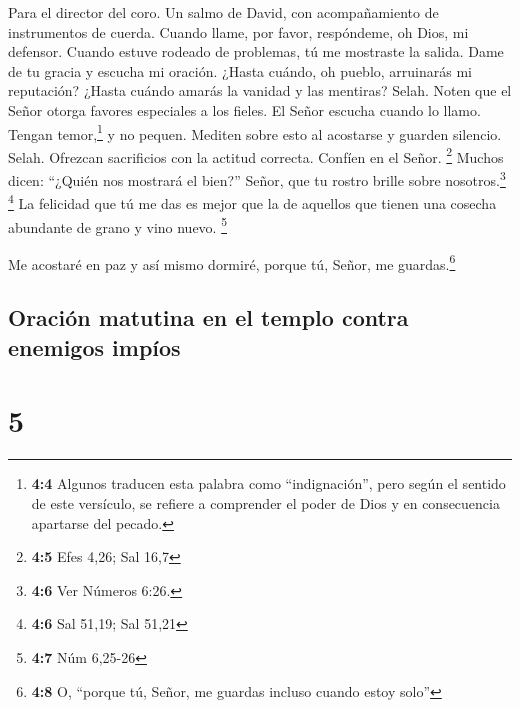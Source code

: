 Para el director del coro. Un salmo de David, con acompañamiento de
instrumentos de cuerda.  Cuando llame, por favor,
respóndeme, oh Dios, mi defensor. Cuando estuve rodeado de problemas, tú
me mostraste la salida. Dame de tu gracia y escucha mi oración.
 ¿Hasta cuándo, oh pueblo, arruinarás mi reputación?
¿Hasta cuándo amarás la vanidad y las mentiras? Selah. 
Noten que el Señor otorga favores especiales a los fieles. El Señor
escucha cuando lo llamo.  Tengan temor,\footnote{\textbf{4:4}
  Algunos traducen esta palabra como ``indignación'', pero según el
  sentido de este versículo, se refiere a comprender el poder de Dios y
  en consecuencia apartarse del pecado.} y no pequen. Mediten sobre esto
al acostarse y guarden silencio. Selah.  Ofrezcan
sacrificios con la actitud correcta. Confíen en el Señor. \footnote{\textbf{4:5}
  Efes 4,26; Sal 16,7}  Muchos dicen: ``¿Quién nos
mostrará el bien?'' Señor, que tu rostro brille sobre
nosotros.\footnote{\textbf{4:6} Ver Números 6:26.} \footnote{\textbf{4:6}
  Sal 51,19; Sal 51,21}  La felicidad que tú me das es
mejor que la de aquellos que tienen una cosecha abundante de grano y
vino nuevo. \footnote{\textbf{4:7} Núm 6,25-26}

 Me acostaré en paz y así mismo dormiré, porque tú, Señor,
me guardas.\footnote{\textbf{4:8} O, ``porque tú, Señor, me guardas
  incluso cuando estoy solo''}

\hypertarget{oraciuxf3n-matutina-en-el-templo-contra-enemigos-impuxedos}{%
\subsection{Oración matutina en el templo contra enemigos
impíos}\label{oraciuxf3n-matutina-en-el-templo-contra-enemigos-impuxedos}}

\hypertarget{section-4}{%
\section{5}\label{section-4}}

